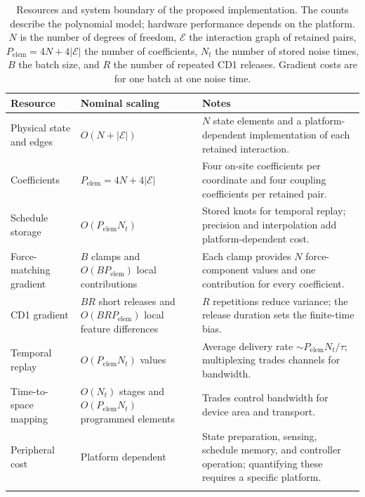 \documentclass[referee,lineno,pdflatex,sn-nature]{sn-jnl}
\begin{document}
\begin{table}[t]
\caption{Resources and system boundary of the proposed implementation. The counts
describe the polynomial model; hardware performance depends on the platform. $N$ is
the number of degrees of freedom, $\mathcal E$ the interaction graph of retained
pairs, $P_{\mathrm{elem}}=4N+4|\mathcal E|$ the number of coefficients, $N_t$ the
number of stored noise times, $B$ the batch size, and $R$ the number of repeated CD1
releases. Gradient costs are for one batch at one noise time.}
\label{tab:scaling}
\small
\begin{tabular*}{\textwidth}{@{\extracolsep\fill}
>{\raggedright\arraybackslash}p{}
>{\raggedright\arraybackslash}p{}
>{\raggedright\arraybackslash}p{}}
\toprule
Resource & Nominal scaling & Notes \\
\midrule
Physical state and edges & $O(N+|\mathcal E|)$ & $N$ state elements and a
platform-dependent implementation of each retained interaction. \\
Coefficients & $P_{\mathrm{elem}}=4N+4|\mathcal E|$ & Four on-site coefficients per coordinate and
four coupling coefficients per retained pair. \\
Schedule storage & $O(P_{\mathrm{elem}}N_t)$ & Stored knots for temporal replay;
precision and interpolation add platform-dependent cost. \\
Force-matching gradient & $B$ clamps and $O(BP_{\mathrm{elem}})$ local
contributions & Each clamp provides $N$ force-component values and one contribution
for every coefficient. \\
CD1 gradient & $BR$ short releases and $O(BRP_{\mathrm{elem}})$ local feature
differences & $R$ repetitions reduce variance; the release duration sets the
finite-time bias. \\
Temporal replay & $O(P_{\mathrm{elem}}N_t)$ values & Average delivery rate
$\sim P_{\mathrm{elem}}N_t/\tau$; multiplexing trades channels for bandwidth. \\
Time-to-space mapping & $O(N_t)$ stages and $O(P_{\mathrm{elem}}N_t)$ programmed
elements & Trades control bandwidth for device area and transport. \\
Peripheral cost & Platform dependent & State preparation, sensing, schedule memory,
and controller operation; quantifying these requires a specific platform. \\
\botrule
\end{tabular*}
\end{table}
\end{document}
